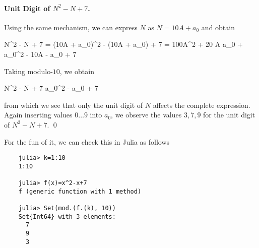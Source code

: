 \paragraph{Unit Digit of $N^2-N+7$.} Using the same mechanism, we can express $N$ as $N = 10A+  a_0$ and obtain

\bee
N^2 - N + 7 = (10A + a_0)^2 - (10A + a_0) + 7 = 100A^2 + 20 A a_0 + a_0^2 - 10A - a_0 + 7
\eee

Taking modulo-$10$, we obtain

\bee
N^2 - N + 7 \equiv a_0^2 - a_0 + 7 \mod
\eee

from which we see that only the unit digit of $N$ affects the complete expression. Again inserting values $0 \ldots 9$ into $a_0$, we observe the values $3, 7, 9$ for the unit digit of $N^2-N+7$. \qed

For the fun of it, we can check this in Julia as follows

\begin{verbatim}
    julia> k=1:10
    1:10

    julia> f(x)=x^2-x+7
    f (generic function with 1 method)

    julia> Set(mod.(f.(k), 10))
    Set{Int64} with 3 elements:
      7
      9
      3
\end{verbatim}


